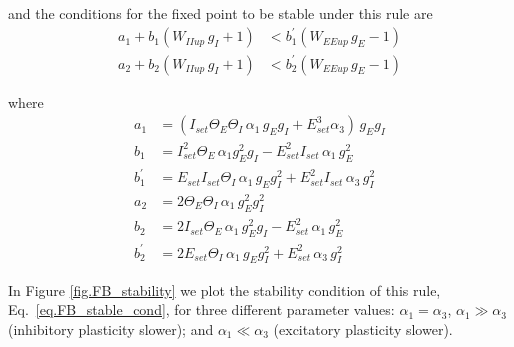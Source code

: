 \documentclass[twocolumn]{article}
\newcommand{\EE}{\mathit{EE}}
\newcommand{\II}{\mathit{II}}
\newcommand{\set}{\mathit{set}}
\newcommand{\up}{\mathit{up}}
\begin{document}
\noindent and the conditions for the fixed point to be stable under this rule are
\begin{equation}
\begin{aligned}
a_1 + b_1(W_{\II\up} \, g_I + 1) & < b_1^\prime(W_{\EE\up} \, g_E - 1) \\
a_2 + b_2(W_{\II\up} \, g_I + 1) & < b_2^\prime(W_{\EE\up} \, g_E - 1)
\end{aligned}
\label{eq.FB_stable_cond}
\end{equation}

\noindent where
\begin{displaymath}
\begin{aligned}
a_1 & = (I_{\set} \Theta_E \Theta_I \, \alpha_1 \, g_E g_I + E_{\set}^3 \alpha_3) \, g_E g_I \\
b_1 & = I_{\set}^2 \Theta_E \, \alpha_1 g_E^2 g_I - E_{\set}^2 I_{\set} \, \alpha_1 \, g_E^2 \\
b_1^\prime & = E_{\set} I_{\set} \Theta_I \, \alpha_1 \, g_E g_I^2 + E_{\set}^2 I_{\set} \, \alpha_3 \, g_I^2 \\
a_2 & = 2 \Theta_E \Theta_I \, \alpha_1 \, g_E^2 g_I^2 \\
b_2 & = 2I_{\set} \Theta_E \, \alpha_1 \, g_E^2 g_I - E_{\set}^2 \, \alpha_1 \, g_E^2 \\
b_2^\prime & = 2E_{\set} \Theta_I \, \alpha_1 \, g_E g_I^2 + E_{\set}^2 \, \alpha_3 \, g_I^2
\end{aligned}
\end{displaymath}


In Figure \ref{fig.FB_stability} we plot the stability condition of this rule, Eq.\ \ref{eq.FB_stable_cond}, for three different parameter values: $\alpha_1 = \alpha_3$, $\alpha_1 \gg \alpha_3$ (inhibitory plasticity slower); and $\alpha_1 \ll \alpha_3$ (excitatory plasticity slower).
\end{document}
